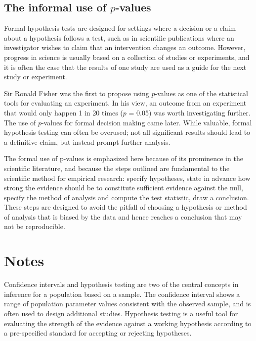 


\subsection{The informal use of $p$-values}
\label{informalUseOfp-values}

Formal hypothesis tests are designed for settings where a decision or a claim about a hypothesis follows a test, such as in scientific publications where an investigator wishes to claim that an intervention changes an outcome.  However, progress in science is usually based on a collection of studies or experiments, and it is often the case that the results of one study are used as a guide for the next study or experiment. 

Sir Ronald Fisher was the first to propose using $p$-values as one of the statistical tools for evaluating an experiment.  In his view, an outcome from an experiment that would only happen 1 in 20 times ($p$ = 0.05) was worth investigating further. The use of $p$-values for formal decision making came later.  While valuable, formal hypothesis testing can often be overused; not all significant results should lead to a definitive claim, but instead prompt further analysis.

The formal use of p-values is emphasized here because of its prominence in the scientific literature, and because the steps outlined are fundamental to the scientific method for empirical research: specify hypotheses, state in advance how strong the evidence should be to constitute sufficient evidence against the null, specify the method of analysis and compute the test statistic, draw a conclusion. These steps are designed to avoid the pitfall of choosing a hypothesis or method of analysis that is biased by the data and hence reaches a conclusion that may not be reproducible.

\newpage

\section{Notes}
\label{ch4Summary}

Confidence intervals and hypothesis testing are two of the central concepts in inference for a population based on a sample. The confidence interval shows a range of population parameter values consistent with the observed sample, and is often used to design additional studies. Hypothesis testing is a useful tool for evaluating the strength of the evidence against a working hypothesis according to a pre-specified standard for accepting or rejecting hypotheses.

